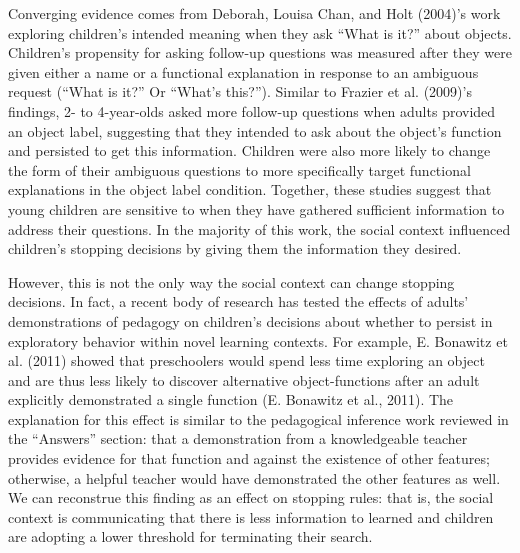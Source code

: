 \documentclass[english,floatsintext,man]{apa6}
\theoremstyle{definition}
\theoremstyle{definition}
\theoremstyle{definition}
\theoremstyle{remark}
\begin{document}
Converging evidence comes from Deborah, Louisa Chan, and Holt (2004)'s
work exploring children's intended meaning when they ask \enquote{What
is it?} about objects. Children's propensity for asking follow-up
questions was measured after they were given either a name or a
functional explanation in response to an ambiguous request
(\enquote{What is it?} Or \enquote{What's this?}). Similar to Frazier et
al. (2009)'s findings, 2- to 4-year-olds asked more follow-up questions
when adults provided an object label, suggesting that they intended to
ask about the object's function and persisted to get this information.
Children were also more likely to change the form of their ambiguous
questions to more specifically target functional explanations in the
object label condition. Together, these studies suggest that young
children are sensitive to when they have gathered sufficient information
to address their questions. In the majority of this work, the social
context influenced children's stopping decisions by giving them the
information they desired.

However, this is not the only way the social context can change stopping
decisions. In fact, a recent body of research has tested the effects of
adults' demonstrations of pedagogy on children's decisions about whether
to persist in exploratory behavior within novel learning contexts. For
example, E. Bonawitz et al. (2011) showed that preschoolers would spend
less time exploring an object and are thus less likely to discover
alternative object-functions after an adult explicitly demonstrated a
single function (E. Bonawitz et al., 2011). The explanation for this
effect is similar to the pedagogical inference work reviewed in the
\enquote{Answers} section: that a demonstration from a knowledgeable
teacher provides evidence for that function and against the existence of
other features; otherwise, a helpful teacher would have demonstrated the
other features as well. We can reconstrue this finding as an effect on
stopping rules: that is, the social context is communicating that there
is less information to learned and children are adopting a lower
threshold for terminating their search.
\end{document}
